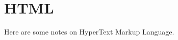 \documentclass{article}
\begin{document}
\section*{HTML}
Here are some notes on HyperText Markup Language.
\end{document}
